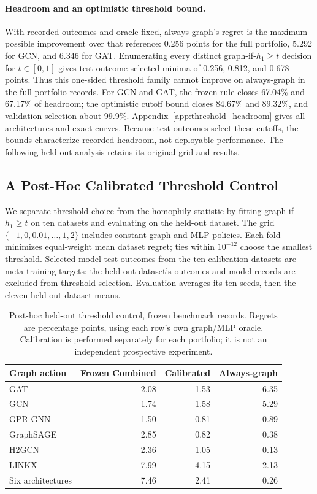 \paragraph{Headroom and an optimistic threshold bound.}
With recorded outcomes and oracle fixed, always-graph's regret is the maximum possible improvement over that reference: 0.256 points for the full portfolio, 5.292 for GCN, and 6.346 for GAT. Enumerating every distinct graph-if-$h_1\geq t$ decision for $t\in[0,1]$ gives test-outcome-selected minima of 0.256, 0.812, and 0.678 points. Thus this one-sided threshold family cannot improve on always-graph in the full-portfolio records. For GCN and GAT, the frozen rule closes 67.04\% and 67.17\% of headroom; the optimistic cutoff bound closes 84.67\% and 89.32\%, and validation selection about 99.9\%. Appendix~\ref{app:threshold_headroom} gives all architectures and exact curves. Because test outcomes select these cutoffs, the bounds characterize recorded headroom, not deployable performance. The following held-out analysis retains its original grid and results.

\subsection{A Post-Hoc Calibrated Threshold Control}
\label{sec:calibrated_threshold}

We separate threshold choice from the homophily statistic by fitting graph-if-$h_1\geq t$ on ten datasets and evaluating on the held-out dataset. The grid $\{-1,0,0.01,\ldots,1,2\}$ includes constant graph and MLP policies. Each fold minimizes equal-weight mean dataset regret; ties within $10^{-12}$ choose the smallest threshold. Selected-model test outcomes from the ten calibration datasets are meta-training targets; the held-out dataset's outcomes and model records are excluded from threshold selection. Evaluation averages its ten seeds, then the eleven held-out dataset means.

\begin{table}[t]
\centering
\caption{Post-hoc held-out threshold control, frozen benchmark records. Regrets are percentage points, using each row's own graph/MLP oracle. Calibration is performed separately for each portfolio; it is not an independent prospective experiment.}
\label{tab:calibrated_threshold}
\small
\setlength{\tabcolsep}{3.5pt}
\begin{tabular}{@{}lrrr@{}}
\toprule
Graph action & Frozen Combined & Calibrated & Always-graph \\
\midrule
GAT & 2.08 & 1.53 & 6.35 \\
GCN & 1.74 & 1.58 & 5.29 \\
GPR-GNN & 1.50 & 0.81 & 0.89 \\
GraphSAGE & 2.85 & 0.82 & 0.38 \\
H2GCN & 2.36 & 1.05 & 0.13 \\
LINKX & 7.99 & 4.15 & 2.13 \\
Six architectures & 7.46 & 2.41 & 0.26 \\
\bottomrule
\end{tabular}
\end{table}

